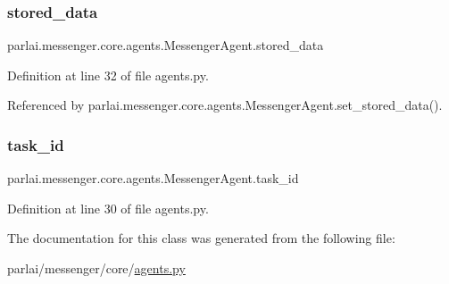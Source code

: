 \subsubsection{\texorpdfstring{stored\+\_\+data}{stored\_data}}
{\footnotesize\ttfamily parlai.\+messenger.\+core.\+agents.\+Messenger\+Agent.\+stored\+\_\+data}



Definition at line 32 of file agents.\+py.



Referenced by parlai.\+messenger.\+core.\+agents.\+Messenger\+Agent.\+set\+\_\+stored\+\_\+data().

\mbox{\label{classparlai_1_1messenger_1_1core_1_1agents_1_1MessengerAgent_a1e5058b5b6b5d3695647e87aac51d59d}} 
\subsubsection{\texorpdfstring{task\+\_\+id}{task\_id}}
{\footnotesize\ttfamily parlai.\+messenger.\+core.\+agents.\+Messenger\+Agent.\+task\+\_\+id}



Definition at line 30 of file agents.\+py.



The documentation for this class was generated from the following file\+:\begin{DoxyCompactItemize}
\item 
parlai/messenger/core/\hyperlink{parlai_2messenger_2core_2agents_8py}{agents.\+py}\end{DoxyCompactItemize}
